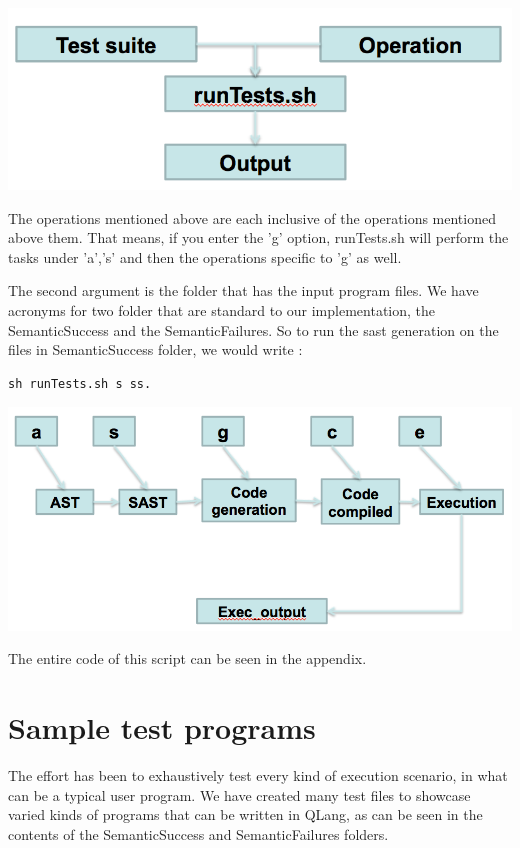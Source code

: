 \includegraphics[scale=0.60]{Test_diagrams/2.png}

The operations mentioned above are each inclusive of the operations mentioned above them. That means, if you enter the 'g' option, runTests.sh will perform the tasks under 'a','s' and then the operations specific to 'g' as well.

The second argument is the folder that has the input program files. We have acronyms for two folder that are standard to our implementation, the SemanticSuccess and the SemanticFailures. So to run the sast generation on the files in SemanticSuccess folder, we would write :
\\
\begin{lstlisting}
sh runTests.sh s ss.
\end{lstlisting}

\includegraphics[scale=0.60]{Test_diagrams/1.png}


The entire code of this script can be seen in the appendix.


\section{Sample test programs}

The effort has been to exhaustively test every kind of execution scenario, in what can be a typical user program. We have created many test files to showcase varied kinds of programs that can be written in QLang, as can be seen in the contents of the SemanticSuccess and SemanticFailures folders.

